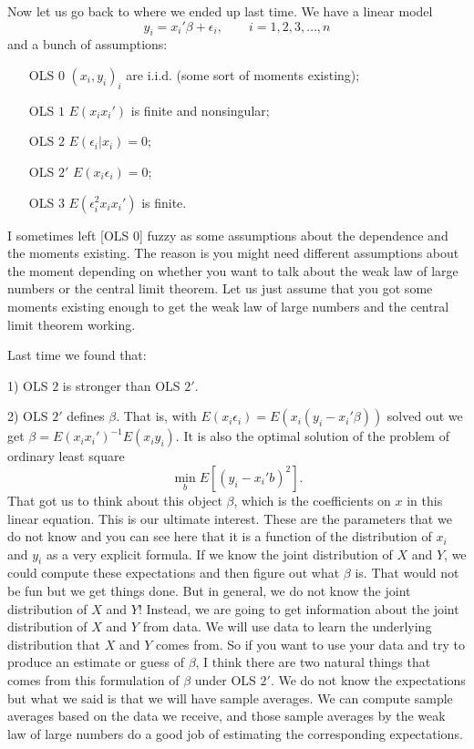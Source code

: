 \documentclass[11pt,a4paper]{amsart}
\theoremstyle{plain}
\theoremstyle{definition}
\begin{document}
	Now let us go back to where we ended up last time. We have a linear model
	\[	y_{i} = x_{i}' \beta + \epsilon_{i}, \qquad i = 1,2,3, \dots, n	\]
	and a bunch of assumptions:
	\begin{itemize}
		\item [OLS $0$] $(x_{i}, y_{i})_{i}$ are i.i.d. (some sort of moments existing);
		\item [OLS $1$] $E(x_{i}x_{i}')$ is finite and nonsingular;
		\item [OLS $2$] $E(\epsilon_{i} | x_{i}) = 0$;
		\item [OLS $2'$] $E(x_{i}\epsilon_{i}) = 0$;
		\item [OLS $3$] $E(\epsilon_{i}^{2}x_{i}x_{i}')$ is finite.
	\end{itemize}\par 
	I sometimes left [OLS $0$] fuzzy as some assumptions about the dependence and the moments existing. The reason is you might need different assumptions about the moment depending on whether you want to talk about the weak law of large numbers or the central limit theorem. Let us just assume that you got some moments existing enough to get the weak law of large numbers and the central limit theorem working.\par 
	Last time we found that:\par 
	 1) OLS $2$ is stronger than OLS $2'$.\par 
	 2) OLS $2'$ defines $\beta$. That is, with $E(x_{i}\epsilon_{i}) = E(x_{i}(y_{i}-x_{i}' \beta))$ solved out we get $\beta = E(x_{i}x_{i}')^{-1}E(x_{i}y_{i})$. It is also the optimal solution of the problem of ordinary least square 
	 \[	\min_{b} E[(y_{i}-x_{i}'b)^{2}].	\]
	 That got us to think about this object $\beta$, which is the coefficients on $x$ in this linear equation. This is our ultimate interest. These are the parameters that we do not know and you can see here that it is a function of the distribution of $x_{i}$ and $y_{i}$ as a very explicit formula. If we know the joint distribution of $X$ and $Y$, we could compute these expectations and then figure out what $\beta$ is. That would not be fun but we get things done. But in general, we do not know the joint distribution of $X$ and $Y$! Instead, we are going to get information about the joint distribution of $X$ and $Y$ from data. We will use data to learn the underlying distribution that $X$ and $Y$ comes from. So if you want to use your data and try to produce an estimate or guess of $\beta$, I think there are two natural things that comes from this formulation of $\beta$ under OLS $2'$. We do not know the expectations but what we said is that we will have sample averages. We can compute sample averages based on the data we receive, and those sample averages by the weak law of large numbers do a good job of estimating the corresponding expectations.\par 
\end{document}
